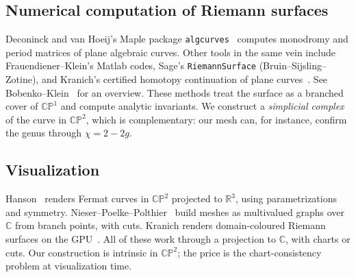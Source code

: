 \documentclass[11pt]{article}
\newcommand{\CP}{\mathbb{CP}}
\begin{document}
\subsection{Numerical computation of Riemann surfaces}
Deconinck and van Hoeij's Maple package \texttt{algcurves}~\cite{deconinckvanhoeij2001}
computes monodromy and period matrices of plane algebraic curves. Other
tools in the same vein include Frauendiener--Klein's Matlab codes, Sage's
\texttt{RiemannSurface} (Bruin--Sijsling--Zotine), and Kranich's certified
homotopy continuation of plane curves~\cite{kranich2016}. See
Bobenko--Klein~\cite{bobenkoklein2013} for an overview. These methods treat
the surface as a branched cover of $\CP^1$ and compute analytic invariants.
We construct a \emph{simplicial complex} of the curve in $\CP^2$, which is
complementary: our mesh can, for instance, confirm the genus through
$\chi=2-2g$.

\subsection{Visualization}
Hanson~\cite{hanson1994} renders Fermat curves in $\CP^2$ projected to
$\mathbb R^3$, using parametrizations and symmetry.
Nieser--Poelke--Polthier~\cite{nieser2010} build meshes as multivalued
graphs over $\mathbb C$ from branch points, with cuts. Kranich renders
domain-coloured Riemann surfaces on the GPU~\cite{kranich2016}. All of these
work through a projection to $\mathbb C$, with charts or cuts. Our
construction is intrinsic in $\CP^2$; the price is the chart-consistency
problem at visualization time.
\end{document}
